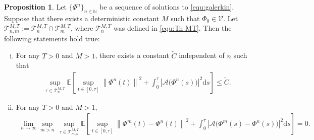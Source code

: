 \documentclass[11pt, reqno]{amsart}
\theoremstyle{definition}
\newtheorem{proposition}[theorem]{Proposition}
\numberwithin{equation}{section}
\newcommand{\bb}{\mathbb}
\newcommand{\ds}{\mathrm{d}s}
\newcommand{\norm}[1]{\left\|{#1}\right\|}
\newcommand{\abs}[1]{\left|{#1}\right|}
\begin{document}
\begin{proposition}\label{pro:hypotheses}
Let $\{\Phi^n\}_{n\in \bb{N}}$ be a sequence of solutions to \eqref{equ:galerkin}. Suppose that there exists a deterministic constant $M$ such that $\Phi_0\in \mathcal{V}$. Let $\mathcal{T}_{n,m}^{M,T}:= \mathcal{T}_n^{M,T} \cap \mathcal{T}_m^{M,T}$, where $\mathcal{T}_n^{M,T}$ was defined in \eqref{equ:Tn MT}.
Then the following statements hold true:
\begin{enumerate}[(i)]
	\item For any $T>0$ and $M>1$, there exists a constant $\widetilde{C}$ independent of $n$ such that
	\begin{align}\label{equ:E bound}
		\sup_{\tau\in \mathcal{T}_{n}^{M,T}} \bb{E} \left[ \sup_{t\in [0,\tau]} \norm{\Phi^n(t)}^2 + \int_0^\tau \abs{\mathcal{A}\big(\Phi^n (s)\big)}^2 \ds \right] \leq \widetilde{C}.
	\end{align}
	\item For any $T>0$ and $M>1$,
	\begin{align}\label{equ:lim sup cauchy}
		\lim_{n\to\infty} \sup_{m>n}\, \sup_{\tau\in \mathcal{T}_{m,n}^{M,T}} \bb{E} \left[ \sup_{t\in [0,\tau]} \norm{\Phi^m(t)-\Phi^n(t)}^2 + \int_0^\tau \abs{\mathcal{A}\big(\Phi^m(s)-\Phi^n (s)\big)}^2 \ds \right] = 0. 
	\end{align}
\end{enumerate}
\end{proposition}
\end{document}
